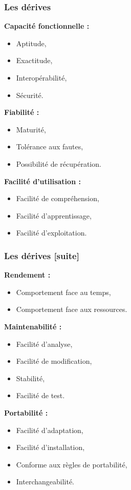 \documentclass[10pt]{beamer}
\begin{document}
%
\begin{frame}
\frametitle{Les dérives}
\pause[2] \textbf{Capacité fonctionnelle :}
	\begin{itemize}
	\item<3->Aptitude,
	\item<4->Exactitude,
	\item<5->Interopérabilité,
	\item<6->Sécurité.
	\end{itemize}

\medskip

\pause[7] \textbf{Fiabilité :}
	\begin{itemize}
	\item<8->Maturité,
	\item<9->Tolérance aux fautes,
	\item<10->Possibilité de récupération.
	\end{itemize}

\medskip

\pause[11] \textbf{Facilité d'utilisation :}
	\begin{itemize}
	\item<12->Facilité de compréhension,
	\item<13->Facilité d'apprentissage,
	\item<14->Facilité d'exploitation.
	\end{itemize}
\end{frame}

\begin{frame}
\frametitle{Les dérives [suite]}
\pause[2] \textbf{Rendement :}
	\begin{itemize}
	\item<3->Comportement face au temps,
	\item<4->Comportement face aux ressources.
	\end{itemize}

\medskip

\pause[5] \textbf{Maintenabilité :}
	\begin{itemize}
	\item<6->Facilité d'analyse,
	\item<7->Facilité de modification,
	\item<8->Stabilité,
	\item<9->Facilité de test.
	\end{itemize}

\medskip

\pause[10] \textbf{Portabilité :}
	\begin{itemize}
	\item<11->Facilité d'adaptation,
	\item<12->Facilité d'installation,
	\item<13->Conforme aux règles de portabilité,
	\item<14->Interchangeabilité.
	\end{itemize}
\end{frame}
\end{document}
